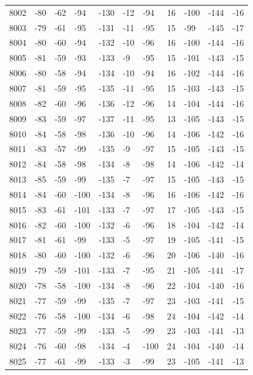 \begin{table}[H]
\begin{tabular}{lllllllllll}
8002 & -80 & -62 & -94 & -130 & -12 & -94 & 16 & -100 & -144 & -16 \\
8003 & -79 & -61 & -95 & -131 & -11 & -95 & 15 & -99 & -145 & -17 \\
8004 & -80 & -60 & -94 & -132 & -10 & -96 & 16 & -100 & -144 & -16 \\
8005 & -81 & -59 & -93 & -133 & -9 & -95 & 15 & -101 & -143 & -15 \\
8006 & -80 & -58 & -94 & -134 & -10 & -94 & 16 & -102 & -144 & -16 \\
8007 & -81 & -59 & -95 & -135 & -11 & -95 & 15 & -103 & -143 & -15 \\
8008 & -82 & -60 & -96 & -136 & -12 & -96 & 14 & -104 & -144 & -16 \\
8009 & -83 & -59 & -97 & -137 & -11 & -95 & 13 & -105 & -143 & -15 \\
8010 & -84 & -58 & -98 & -136 & -10 & -96 & 14 & -106 & -142 & -16 \\
8011 & -83 & -57 & -99 & -135 & -9 & -97 & 15 & -105 & -143 & -15 \\
8012 & -84 & -58 & -98 & -134 & -8 & -98 & 14 & -106 & -142 & -14 \\
8013 & -85 & -59 & -99 & -135 & -7 & -97 & 15 & -105 & -143 & -15 \\
8014 & -84 & -60 & -100 & -134 & -8 & -96 & 16 & -106 & -142 & -16 \\
8015 & -83 & -61 & -101 & -133 & -7 & -97 & 17 & -105 & -143 & -15 \\
8016 & -82 & -60 & -100 & -132 & -6 & -96 & 18 & -104 & -142 & -14 \\
8017 & -81 & -61 & -99 & -133 & -5 & -97 & 19 & -105 & -141 & -15 \\
8018 & -80 & -60 & -100 & -132 & -6 & -96 & 20 & -106 & -140 & -16 \\
8019 & -79 & -59 & -101 & -133 & -7 & -95 & 21 & -105 & -141 & -17 \\
8020 & -78 & -58 & -100 & -134 & -8 & -96 & 22 & -104 & -140 & -16 \\
8021 & -77 & -59 & -99 & -135 & -7 & -97 & 23 & -103 & -141 & -15 \\
8022 & -76 & -58 & -100 & -134 & -6 & -98 & 24 & -104 & -142 & -14 \\
8023 & -77 & -59 & -99 & -133 & -5 & -99 & 23 & -103 & -141 & -13 \\
8024 & -76 & -60 & -98 & -134 & -4 & -100 & 24 & -104 & -140 & -14 \\
8025 & -77 & -61 & -99 & -133 & -3 & -99 & 23 & -105 & -141 & -13 \\

\end{tabular}
\end{table}

